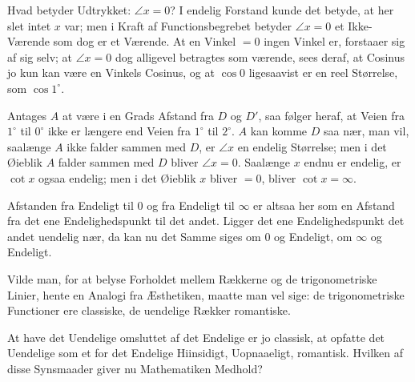 \documentclass[12pt]{book}
\newcommand{\opage}[1]{\marginnote{\footnotesize\textit{[#1]}}}
\begin{document}
Hvad betyder Udtrykket: $\angle x = 0$? I endelig Forstand kunde det betyde, at
her slet intet $x$ var; men i Kraft af Functionsbegrebet betyder $\angle x = 0$
et Ikke-Værende som dog er et Værende. At en Vinkel $= 0$ ingen Vinkel er,
forstaaer sig af sig selv; at $\angle x = 0$ dog alligevel betragtes som værende,
sees deraf, at Cosinus jo kun kan være en Vinkels Cosinus, og at $\cos 0$
ligesaavist er en reel Størrelse, som $\cos 1^{\circ}$.
\opage{24} %
\begin{center}
\end{center}

Antages $A$ at være i en Grads Afstand fra $D$ og $D'$, saa følger heraf, at
Veien fra $1^{\circ}$ til $0^{\circ}$ ikke er længere end Veien fra $1^{\circ}$
til $2^{\circ}$. $A$ kan komme $D$ saa nær, man vil, saalænge $A$ ikke falder
sammen med $D$, er $\angle x$ en endelig Størrelse; men i det Øieblik $A$ falder
sammen med $D$ bliver $\angle x = 0$. Saalænge $x$ endnu er endelig, er $\cot x$
ogsaa endelig; men i det Øieblik $x$ bliver $= 0$, bliver $\cot x = \infty$.

Afstanden fra Endeligt til $0$ og fra Endeligt til $\infty$ er altsaa her som en
Afstand fra det ene Endelighedspunkt til det andet. Ligger det ene
Endelighedspunkt det andet uendelig nær, da kan nu det Samme siges om $0$ og
Endeligt, om $\infty$ og Endeligt.

Vilde man, for at belyse Forholdet mellem Rækkerne og de trigonometriske Linier,
hente en Analogi fra Æsthetiken, maatte man vel sige: de trigonometriske
Functioner ere classiske, de uendelige Rækker romantiske.

At have det Uendelige omsluttet af det Endelige er jo classisk, at opfatte det
Uendelige som et for det Endelige Hiinsidigt, Uopnaaeligt, romantisk. Hvilken af
disse Synsmaader giver nu Mathematiken Medhold?
\end{document}
